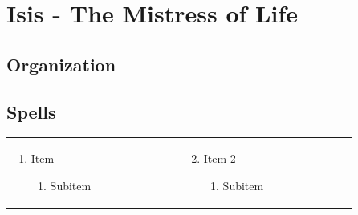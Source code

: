 \chapter{Isis - The Mistress of Life}
\label{ch:divine-isis}
\section{Organization}

\section{Spells}
\renewcommand{\labelenumii}{\arabic{enumii}.}
\begin{tabular}{@{} p{0.25\linewidth} p{0.25\linewidth}}
\begin{enumerate}
	\item Item
	\begin{enumerate}
		\item Subitem
	\end{enumerate}
\end{enumerate} &
\begin{enumerate}
	\setcounter{enumi}{1}
	\item Item 2
	\begin{enumerate}
		\item Subitem
	\end{enumerate}
\end{enumerate} 
\end{tabular}
\pagebreak

\section{}

